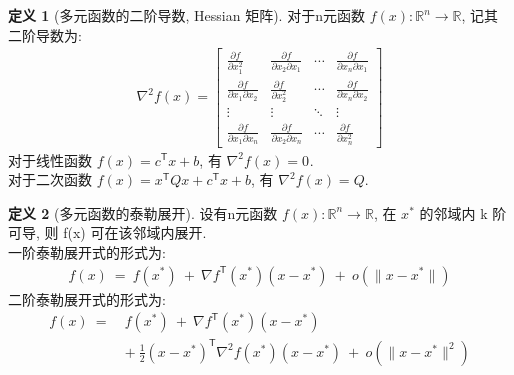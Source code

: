 \documentclass{article}
\theoremstyle{definition}
\newtheorem{definition}{定义}[section]
\theoremstyle{theorem}
\newcommand{\Reals}{\mathbb{R}}
\begin{document}
\begin{definition}[多元函数的二阶导数, Hessian 矩阵] 对于n元函数 \( f(x): \Reals^n \rightarrow \Reals \), 记其二阶导数为:
\begin{align*}
\nabla^2 f(x) = \begin{bmatrix}
  \frac{\partial f}{\partial x_1^2}            & \frac{\partial f}{\partial x_2 \partial x_1} & \cdots & \frac{\partial f}{\partial x_n \partial x_1} \\
  \frac{\partial f}{\partial x_1 \partial x_2} & \frac{\partial f}{\partial x_2^2}            & \cdots & \frac{\partial f}{\partial x_n \partial x_2} \\
  \vdots                                       & \vdots                                       & \ddots & \vdots                                       \\
  \frac{\partial f}{\partial x_1 \partial x_n} & \frac{\partial f}{\partial x_2 \partial x_n} & \cdots & \frac{\partial f}{\partial x_n^2} 
\end{bmatrix}
\end{align*}
对于线性函数 \( f(x) = c^\mathsf{T} x + b \), 有 \( \nabla^2 f(x) = 0^{} \). \\
对于二次函数 \( f(x) = x^\mathsf{T} Qx + c^\mathsf{T} x + b \), 有 \( \nabla^2 f(x) = Q \).
\end{definition}

\begin{definition}[多元函数的泰勒展开] 设有n元函数 \( f(x): \Reals^n \rightarrow \Reals \), 在 \( x^* \) 的邻域内 k 阶可导, 则 f(x) 可在该邻域内展开. \\
一阶泰勒展开式的形式为:
\begin{align*}
f(x) \:=\: f(x^*) \:+\: \nabla f^\mathsf{T}(x^*)(x-x^*) \:+\: o\left(\lVert x-x^*\rVert\right)
\end{align*}
二阶泰勒展开式的形式为:
\begin{align*}
f(x) \:=\: & f(x^*) \:+\: \nabla f^\mathsf{T}(x^*) (x-x^*) \\
       & +\: \frac{1}{2} (x-x^*)^\mathsf{T} \nabla^2 f(x^*) (x-x^*) \:+\: o\left({\lVert x-x^*\rVert^2}\right)
\end{align*}
\end{definition}
\end{document}
